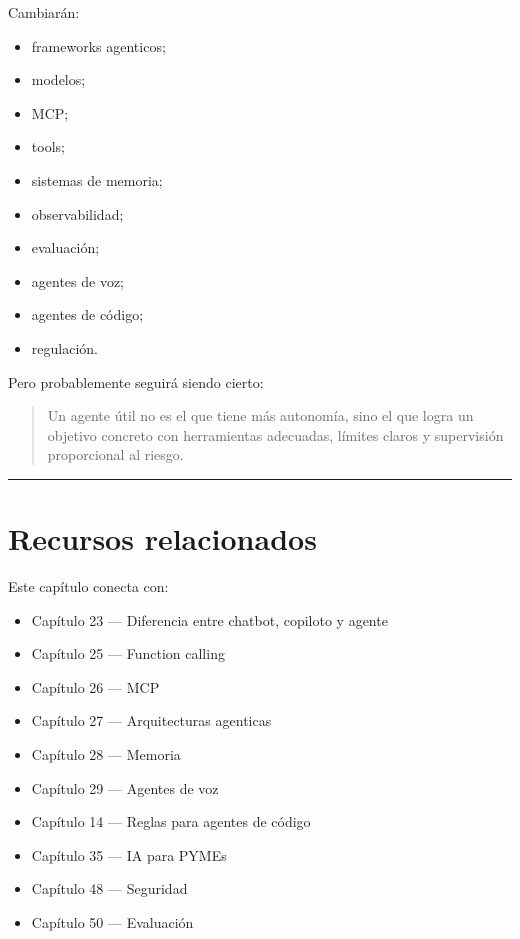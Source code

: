 Cambiarán:

\begin{itemize}
\tightlist
\item
  frameworks agenticos;
\item
  modelos;
\item
  MCP;
\item
  tools;
\item
  sistemas de memoria;
\item
  observabilidad;
\item
  evaluación;
\item
  agentes de voz;
\item
  agentes de código;
\item
  regulación.
\end{itemize}

Pero probablemente seguirá siendo cierto:

\begin{quote}
Un agente útil no es el que tiene más autonomía, sino el que logra un
objetivo concreto con herramientas adecuadas, límites claros y
supervisión proporcional al riesgo.
\end{quote}

\begin{center}\rule{0.5\linewidth}{0.5pt}\end{center}

\section{Recursos relacionados}\label{recursos-relacionados-23}

Este capítulo conecta con:

\begin{itemize}
\tightlist
\item
  Capítulo 23 --- Diferencia entre chatbot, copiloto y agente
\item
  Capítulo 25 --- Function calling
\item
  Capítulo 26 --- MCP
\item
  Capítulo 27 --- Arquitecturas agenticas
\item
  Capítulo 28 --- Memoria
\item
  Capítulo 29 --- Agentes de voz
\item
  Capítulo 14 --- Reglas para agentes de código
\item
  Capítulo 35 --- IA para PYMEs
\item
  Capítulo 48 --- Seguridad
\item
  Capítulo 50 --- Evaluación
\end{itemize}

